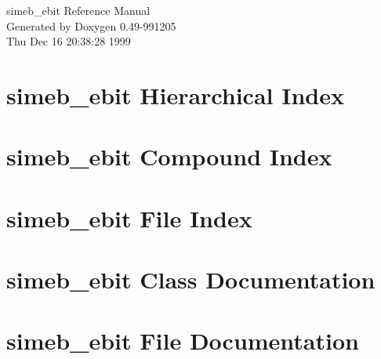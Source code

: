 \documentclass[a4paper]{book}
\begin{document}
\begin{titlepage}
\vspace*{7cm}
\begin{center}
{\Large simeb\_\-ebit Reference Manual}\\
\vspace*{1cm}
{\large Generated by Doxygen 0.49-991205}\\
\vspace*{0.5cm}
{\small Thu Dec 16 20:38:28 1999}\\
\end{center}
\end{titlepage}
\clearemptydoublepage
{}
\tableofcontents
\clearemptydoublepage
{}
\chapter{simeb\_\-ebit Hierarchical Index}

\chapter{simeb\_\-ebit Compound Index}

\chapter{simeb\_\-ebit File Index}

\chapter{simeb\_\-ebit Class Documentation}





























\chapter{simeb\_\-ebit File Documentation}






















\printindex
\end{document}
